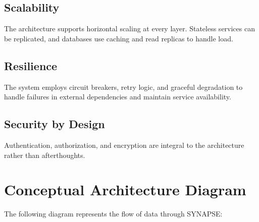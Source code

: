 \documentclass[12pt,a4paper]{report}
\begin{document}
\subsection{Scalability}
The architecture supports horizontal scaling at every layer. Stateless services can be replicated, and databases use caching and read replicas to handle load.

\subsection{Resilience}
The system employs circuit breakers, retry logic, and graceful degradation to handle failures in external dependencies and maintain service availability.

\subsection{Security by Design}
Authentication, authorization, and encryption are integral to the architecture rather than afterthoughts.

\section{Conceptual Architecture Diagram}

The following diagram represents the flow of data through SYNAPSE:
\end{document}
